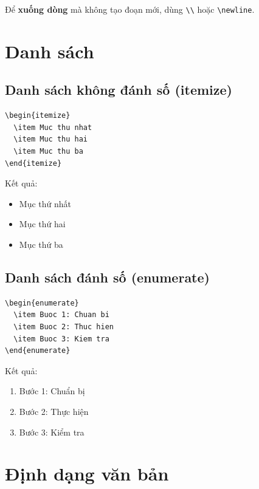 Để \textbf{xuống dòng} mà không tạo đoạn mới, dùng \verb|\\| hoặc \verb|\newline|.

\section{Danh sách}

\subsection{Danh sách không đánh số (itemize)}

\begin{lstlisting}[style=latexstyle]
\begin{itemize}
  \item Muc thu nhat
  \item Muc thu hai
  \item Muc thu ba
\end{itemize}
\end{lstlisting}

Kết quả:
\begin{itemize}
  \item Mục thứ nhất
  \item Mục thứ hai
  \item Mục thứ ba
\end{itemize}

\subsection{Danh sách đánh số (enumerate)}

\begin{lstlisting}[style=latexstyle]
\begin{enumerate}
  \item Buoc 1: Chuan bi
  \item Buoc 2: Thuc hien
  \item Buoc 3: Kiem tra
\end{enumerate}
\end{lstlisting}

Kết quả:
\begin{enumerate}
  \item Bước 1: Chuẩn bị
  \item Bước 2: Thực hiện
  \item Bước 3: Kiểm tra
\end{enumerate}

\section{Định dạng văn bản}

